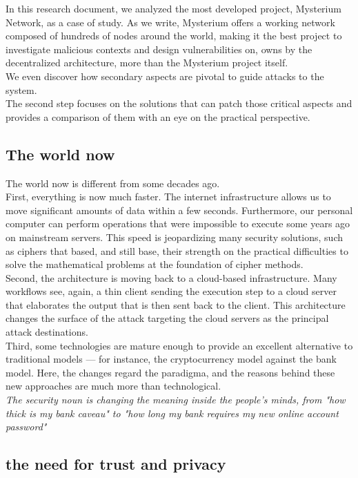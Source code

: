 \documentclass[]{article}
\begin{document}
    In this research document, we analyzed the most developed project, Mysterium Network, as a case of study. As we write, Mysterium offers a working network composed of hundreds of nodes around the world, making it the best project to investigate malicious contexts and design vulnerabilities on, owns by the decentralized architecture, more than the Mysterium project itself.\\
	We even discover how secondary aspects are pivotal to guide attacks to the system.\\
    The second step focuses on the solutions that can patch those critical aspects and provides a comparison of them with an eye on the practical perspective.
	
	\subsection{The world now}
	The world now is different from some decades ago.\\
	First, everything is now much faster. The internet infrastructure allows us to move significant amounts of data within a few seconds. Furthermore, our personal computer can perform operations that were impossible to execute some years ago on mainstream servers. This speed is jeopardizing many security solutions, such as ciphers that based, and still base, their strength on the practical difficulties to solve the mathematical problems at the foundation of cipher methods.\\
	Second, the architecture is moving back to a cloud-based infrastructure. Many workflows see, again, a thin client sending the execution step to a cloud server that elaborates the output that is then sent back to the client. This architecture changes the surface of the attack targeting the cloud servers as the principal attack destinations.\\
	Third, some technologies are mature enough to provide an excellent alternative to traditional models — for instance, the cryptocurrency model against the bank model. Here, the changes regard the paradigma, and the reasons behind these new approaches are much more than technological.\\

	\textit{The security noun is changing the meaning inside the people's minds, from "how thick is my bank caveau" to "how long my bank requires my new online account password"}

	\subsection{the need for trust and privacy}
\end{document}
